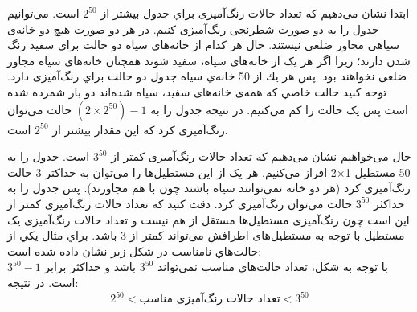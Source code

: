     \p
    ابتدا نشان می‌دهیم که تعداد حالات رنگ‌آمیزی براي جدول بیشتر از 
    $2^{50}$
    است.
  می‌توانیم جدول را به دو صورت شطرنجی رنگ‌آمیزی ‌کنیم. در هر دو صورت هیچ دو خانه‌ی سیاهی مجاور ضلعی نیستند. 
  حال هر کدام از خانه‌های سیاه دو حالت برای سفید رنگ شدن دارند؛ زیرا اگر هر یک از خانه‌های سیاه، سفید شوند همچنان خانه‌های سیاه مجاور ضلعی نخواهند بود.
  پس هر يك از 50 خانه‌ي سياه جدول دو حالت براي رنگ‌آمیزی دارد.  
  ‌توجه كنيد حالت خاصي كه همه‌ی خانه‌های سفید، سیاه شده‌اند دو بار شمرده شده است پس یک حالت را کم می‌کنیم.
  در نتیجه جدول را به 
  $ (2 \times 2^{50})- 1 $ 
   حالت می‌توان رنگ‌آمیزی کرد که این مقدار بیشتر از 
   $2^{50}$
  است.

    \p
     حال می‌خواهیم نشان می‌دهیم که تعداد حالات رنگ‌آمیزی کمتر از 
     $3^{50}$
     است.
      جدول را به 50 مستطیل 1×2 افراز می‌کنیم. هر یک از این مستطیل‌ها را می‌توان به حداکثر 3 حالت رنگ‌آمیزی کرد (هر دو خانه نمی‌توانند سیاه باشند چون با هم مجاورند). پس جدول را به حداکثر $3^{50}$ حالت می‌توان رنگ‌آمیزی کرد. دقت کنید که تعداد حالات رنگ‌آمیزی کمتر از این است چون رنگ‌آمیزی مستطیل‌ها مستقل از هم نیست و تعداد حالات رنگ‌آمیزی یک مستطیل با توجه به مستطیل‌های اطرافش می‌تواند کمتر از 3 باشد.
     براي مثال يكي از حالت‌هاي نامناسب در شكل زير نشان داده شده است:
     \\  
      با توجه به شكل، تعداد حالت‌هاي مناسب نمی‌تواند  
      $3^{50}$
       باشد و حداکثر برابر
      $3^{50}-1$
     است.
    \p
    در نتیجه:
    $$2^{50} < \text{تعداد حالات رنگ‌آمیزی مناسب} < 3^{50}$$
